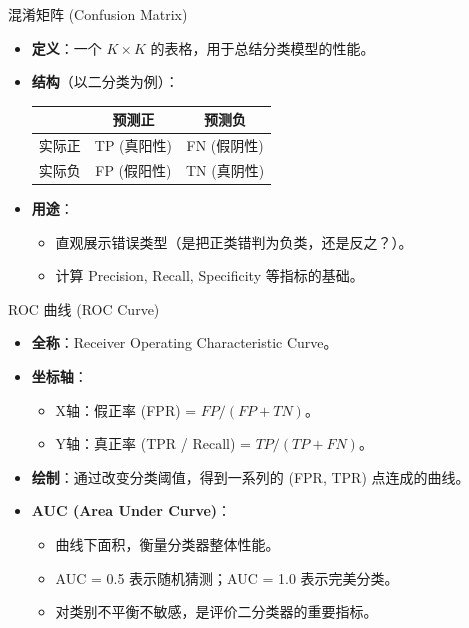 \documentclass[12pt, aspectratio=169]{beamer}
\begin{document}
\begin{frame}{混淆矩阵 (Confusion Matrix)}
    \begin{itemize}
        \item \textbf{定义}：一个 $K \times K$ 的表格，用于总结分类模型的性能。
        \item \textbf{结构}（以二分类为例）：
        \begin{center}
        \begin{tabular}{c|cc}
         & 预测正 & 预测负 \\ \hline
        实际正 & TP (真阳性) & FN (假阴性) \\
        实际负 & FP (假阳性) & TN (真阴性)
        \end{tabular}
        \end{center}
        \item \textbf{用途}：
        \begin{itemize}
            \item 直观展示错误类型（是把正类错判为负类，还是反之？）。
            \item 计算 Precision, Recall, Specificity 等指标的基础。
        \end{itemize}
    \end{itemize}
\end{frame}

\begin{frame}{ROC 曲线 (ROC Curve)}
    \begin{itemize}
        \item \textbf{全称}：Receiver Operating Characteristic Curve。
        \item \textbf{坐标轴}：
        \begin{itemize}
            \item X轴：假正率 (FPR) = $FP / (FP + TN)$。
            \item Y轴：真正率 (TPR / Recall) = $TP / (TP + FN)$。
        \end{itemize}
        \item \textbf{绘制}：通过改变分类阈值，得到一系列的 (FPR, TPR) 点连成的曲线。
        \item \textbf{AUC (Area Under Curve)}：
        \begin{itemize}
            \item 曲线下面积，衡量分类器整体性能。
            \item AUC = 0.5 表示随机猜测；AUC = 1.0 表示完美分类。
            \item 对类别不平衡不敏感，是评价二分类器的重要指标。
        \end{itemize}
    \end{itemize}
\end{frame}
\end{document}
